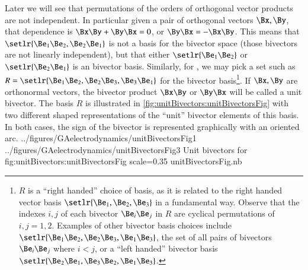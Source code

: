 Later we will see that permutations of the orders of orthogonal vector products are not independent.
In particular
given a pair of orthogonal vectors \( \Bx, \By \), that dependence is
\(\Bx \By + \By \Bx = 0 \),
or \( \By \Bx = - \Bx \By \).  This means that \( \setlr{ \Be_1 \Be_2, \Be_2 \Be_1 } \) is not a basis for the  bivector space (those bivectors are not linearly independent), but that either \( \setlr{ \Be_1 \Be_2 } \) or \( \setlr{ \Be_2 \Be_1 } \) is an  bivector basis.
Similarly, for , we may pick a set such as \( R = \setlr{ \Be_1 \Be_2, \Be_2 \Be_3, \Be_3 \Be_1 } \) for the bivector basis\footnote{\(R\) is a ``right handed'' choice of basis, as it is related to the right handed vector basis \( \setlr{ \Be_1, \Be_2, \Be_3 } \) in a fundamental way.  Observe that the indexes \( i, j \) of each bivector \( \Be_i \Be_j \) in \( R \) are cyclical permutations of \( i,j = 1,2 \).  Examples of other bivector basis choices include \( \setlr{ \Be_1 \Be_2, \Be_2 \Be_3, \Be_1 \Be_3 } \), the set of all pairs of bivectors \( \Be_i \Be_j \) where \( i < j \), or a ``left handed'' bivector basis
\( \setlr{ \Be_2 \Be_1, \Be_3 \Be_2, \Be_1 \Be_3 } \).}.
If \( \Bx, \By \) are orthonormal vectors, the bivector product \( \Bx \By \) or \( \By \Bx \) will be called a unit bivector.
The basis \( R \) is illustrated in
\cref{fig:unitBivectors:unitBivectorsFig} with two different shaped representations of the ``unit'' bivector elements of this basis.
In both cases, the sign of the bivector is represented graphically with an oriented arc.
\mathImageTwoFigures
{../figures/GAelectrodynamics/unitBivectorsFig1}
{../figures/GAelectrodynamics/unitBivectorsFig3}
{Unit bivectors for }
{fig:unitBivectors:unitBivectorsFig}
{scale=0.35}
{unitBivectorsFig.nb}

